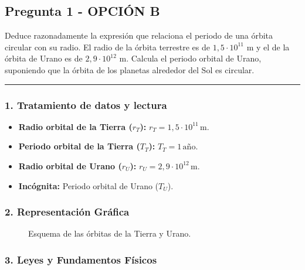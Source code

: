 \newpage

\subsection{Pregunta 1 - OPCIÓN B}
\label{subsec:1B_2018_jul_ext}
\begin{cajaenunciado}
Deduce razonadamente la expresión que relaciona el periodo de una órbita circular con su radio. El radio de la órbita terrestre es de $1,5\cdot10^{11}$ m y el de la órbita de Urano es de $2,9\cdot10^{12}$ m. Calcula el periodo orbital de Urano, suponiendo que la órbita de los planetas alrededor del Sol es circular.
\end{cajaenunciado}
\hrule
\subsubsection*{1. Tratamiento de datos y lectura}
\begin{itemize}
    \item \textbf{Radio orbital de la Tierra ($r_T$):} $r_T = 1,5\cdot10^{11}\,\text{m}$.
    \item \textbf{Periodo orbital de la Tierra ($T_T$):} $T_T = 1\,\text{año}$.
    \item \textbf{Radio orbital de Urano ($r_U$):} $r_U = 2,9\cdot10^{12}\,\text{m}$.
    \item \textbf{Incógnita:} Periodo orbital de Urano ($T_U$).
\end{itemize}
\subsubsection*{2. Representación Gráfica}
\begin{figure}[H]
    \centering
    \caption{Esquema de las órbitas de la Tierra y Urano.}
\end{figure}
\subsubsection*{3. Leyes y Fundamentos Físicos}
